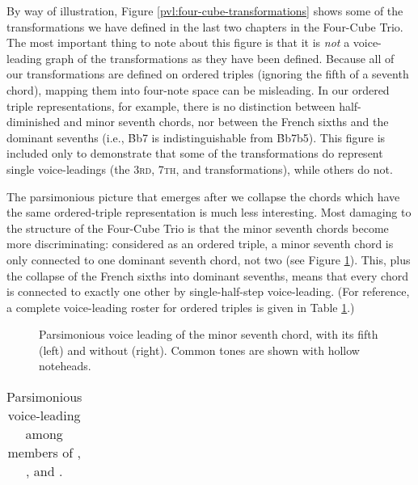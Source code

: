 By way of illustration, Figure \ref{pvl:four-cube-transformations} shows some
of the transformations we have defined in the last two chapters in the
Four-Cube Trio. The most important thing to note about this figure is that it
is \emph{not} a voice-leading graph of the transformations as they have been
defined. Because all of our transformations are defined on ordered triples
(ignoring the fifth of a seventh chord), mapping them into four-note space can
be misleading. In our ordered triple representations, for example, there is no
distinction between half-diminished and minor seventh chords, nor between the
French sixths and the dominant sevenths (i.e., \h{Bb7} is indistinguishable
from \h{Bb7b5}). This figure is included only to demonstrate that some of the
transformations do represent single voice-leadings (the \textsc{3rd},
\textsc{7th}, and \slideS transformations), while others do not.

The parsimonious picture that emerges after we collapse the chords which have
the same ordered-triple representation is much less interesting.
Most damaging to the structure of the Four-Cube Trio is that the minor seventh
chords become more discriminating: considered as an ordered triple, a minor
seventh chord is only connected to one dominant seventh chord, not two (see
Figure \ref{pvl:minor-seventh-parsimony}). This, plus the collapse of the
French sixths into dominant sevenths, means that every chord is connected to
exactly one other by single-half-step voice-leading. (For reference, a
complete voice-leading roster for ordered triples is given in Table
\ref{pvl:vl-table}.)

\begin{figure}[tbp]
  \caption[Parsimonious voice leading of the minor seventh
    chord.]{Parsimonious voice leading of the minor seventh chord, with its
      fifth (left) and without (right). Common tones are shown with hollow noteheads.}
  \label{pvl:minor-seventh-parsimony}
\end{figure}

\begin{table}[tbp]
  \centering
  \begin{tabular}{}

  \end{tabular}
  \caption{Parsimonious voice-leading among members of \Smin, \Sdom, and
    \Smaj.}
  \label{pvl:vl-table}
\end{table}

